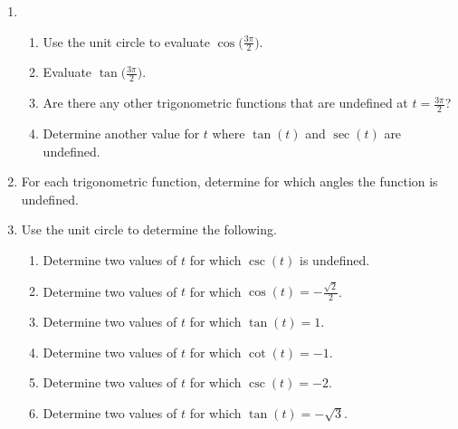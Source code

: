 \begin{enumerate}
\item \begin{enumerate} 
\item Use the unit circle to evaluate $\displaystyle \cos\Big(\frac{3\pi}{2}\Big)$.\\[.2in]
\item Evaluate $\displaystyle \tan\Big(\frac{3\pi}{2}\Big)$. \\[.2in]
\item Are there any other trigonometric functions that are undefined at $\displaystyle t= \frac{3\pi}{2}$?\\[.2in]
\item Determine another value for $t$ where $\tan(t)$ and $\sec(t)$ are undefined. \\[.2in]
\end{enumerate}

\vfill

\item For each trigonometric function, determine for which angles the function is undefined.

\vfill

\newpage

\item Use the unit circle to determine the following.
\begin{enumerate}


\item Determine two values of $t$ for which $\csc(t)$ is undefined.
\vfill

\item Determine two values of $t$ for which $\cos(t)=-\frac{\sqrt{2}}{2}$.
\vfill

\item Determine two values of $t$ for which $\tan(t)=1$.
\vfill

\item Determine two values of $t$ for which $\cot(t)=-1$.
\vfill

\item Determine two values of $t$ for which $\csc(t)=-2$.
\vfill

\item Determine two values of $t$ for which $\tan(t)=-\sqrt{3}$.
\vfill

\end{enumerate}


\end{enumerate}

